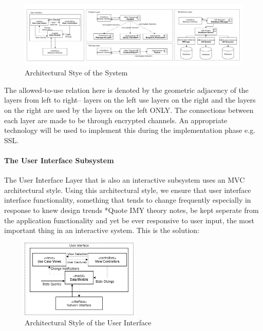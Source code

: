 \documentclass[11pt]{article}
\begin{document}
\begin{figure}[H]
	\centering
	\hspace*{-2.1cm}\includegraphics[width=1.25\textwidth]{../../images/Botic_Layered_Architecture.png}
	\caption{Architectural Stye of the System}
\end{figure}

The allowed-to-use relation here is denoted by the geometric adjacency of the layers from left to right-- layers on the left use layers on the right and the layers on the right are used by the layers on the left ONLY. The connections between each layer are made to be through encrypted channels. An appropriate technology will be used to implement this during the implementation phase e.g. SSL.

\paragraph{The User Interface Subsystem}
The User Interface Layer that is also an interactive subsystem uses an MVC architectural style. Using this architectural style, we ensure that user interface interface functionality, something that tends to change frequently especially in response to knew design trends *Quote IMY theory notes, be kept seperate from the application functionality and yet be ever responsive to user input, the most important thing in an interactive system\cite{Book:2}. This is the solution:

\begin{figure}[H]
	\centering
	\includegraphics[width=0.5\textwidth]{../../images/User_Interface_MVC.png}
	\caption{Architectural Style of the User Interface}
\end{figure}
\end{document}
